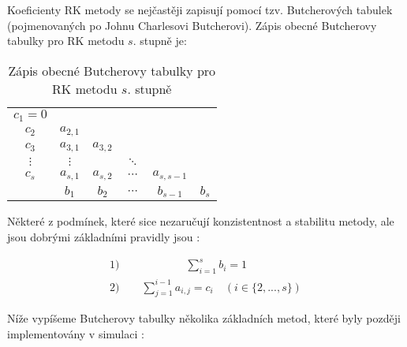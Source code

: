 Koeficienty RK metody se nejčastěji zapisují pomocí tzv. Butcherových tabulek \cite{Butcher_tab_def} (pojmenovaných po Johnu Charlesovi Butcherovi). Zápis obecné Butcherovy tabulky pro RK metodu $s$. stupně je:
\begin{table}[!ht]
    \centering
    \captionsetup{singlelinecheck=off}
    \caption{Zápis obecné Butcherovy tabulky pro RK metodu $s$. stupně}
    \label{tab:Butch_tab}

    \begin{tabularx}{7cm}{c | c c c c c}
        $c_1 = 0$                                                            \\
        $c_2$    & $a_{2, 1}$                                                \\
        $c_3$    & $a_{3, 1}$ & $a_{3, 2}$                                   \\
        $\vdots$ & $\vdots$   &            & $\ddots$                        \\
        $c_s$    & $a_{s, 1}$ & $a_{s, 2}$ & $\cdots$ & $a_{s, s-1}$         \\
        \hline
                 & $b_1$      & $b_2$      & $\cdots$ & $b_{s-1}$    & $b_s$ \\
    \end{tabularx}
\end{table}

Některé z podmínek, které sice nezaručují konzistentnost a stabilitu metody, ale jsou dobrými základními pravidly jsou \cite{Butcher_tab_def}:

\begin{equation}
    \label{eq:RK_conditions}
    \begin{gathered}
        \text{1)} \quad \quad \qquad \qquad \sum_{i=1}^{s} b_i = 1 \qquad \qquad \\
        \text{2)} \quad \quad \sum_{j=1}^{i-1} a_{i,j} = c_i \quad (i \in \{2,...,s\})
    \end{gathered}
\end{equation}

Níže vypíšeme Butcherovy tabulky několika základních metod, které byly později implementovány v simulaci \cite{RK_methods_list}:

